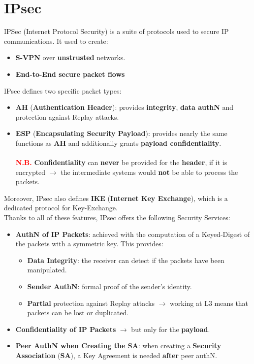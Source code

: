 \section{IPsec}
IPSec (Internet Protocol Security) is a suite of protocols used to secure IP communications. It used to create:
\begin{itemize}
    \item \textbf{S-VPN} over \textbf{unstrusted} networks.
    \item \textbf{End-to-End secure packet flows}
\end{itemize}
IPsec defines two specific packet types:
\begin{itemize}
    \item \textbf{AH} (\textbf{Authentication Header}): provides \textbf{integrity}, \textbf{data authN} and protection against Replay attacks.
    \item \textbf{ESP} (\textbf{Encapsulating Security Payload}): provides nearly the same functions as \textbf{AH} and additionally grants \textbf{payload confidentiality}.\\    \\
    \textcolor{red}{\textbf{N.B.}} \textbf{Confidentiality} can \textbf{never} be provided for the \textbf{header}, if it is encrypted \(\rightarrow \) the intermediate systems would \textbf{not} be able to process the packets.
\end{itemize}
\noindent
Moreover, IPsec also defines \textbf{IKE} (\textbf{Internet Key Exchange}), which is a dedicated protocol for Key-Exchange.
\\ Thanks to all of these features, IPsec offers the following Security Services:
\begin{itemize}
    \item \textbf{AuthN of IP Packets}: achieved with the computation of a Keyed-Digest of the packets
    with a symmetric key. This provides:
    \begin{itemize}
        \item \textbf{Data Integrity}: the receiver can detect if the packets have been manipulated.
        \item \textbf{Sender AuthN}:  formal proof of the sender’s identity.
        \item \textbf{Partial} protection against Replay attacks \(\rightarrow \) working at L3 means that packets can be lost or duplicated.
    \end{itemize}
    \item \textbf{Confidentiality of IP Packets} \(\rightarrow \) but only for the \textbf{payload}.
    \item \textbf{Peer AuthN when Creating the SA}: when creating a \textbf{Security Association} (\textbf{SA}), a Key Agreement is needed \textbf{after} peer authN.
\end{itemize}

